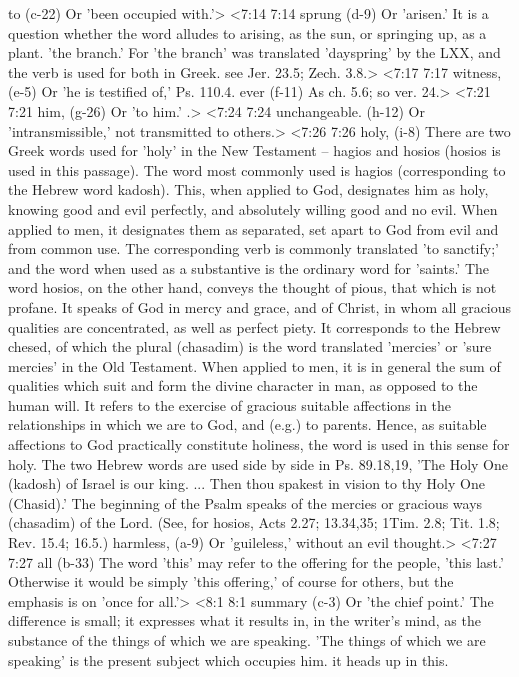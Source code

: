   to (c-22)  Or 'been occupied with.'>
<7:14 7:14  sprung (d-9)  Or 'arisen.' It is a question whether the word alludes to  arising, as the sun, or springing up, as a plant. 'the branch.'  For 'the branch' was translated 'dayspring' by the LXX, and the  verb is used for both in Greek. see Jer. 23.5; Zech. 3.8.>
<7:17 7:17  witness, (e-5)  Or 'he is testified of,' Ps. 110.4.
  ever (f-11)  As ch. 5.6; so ver. 24.>
<7:21 7:21  him, (g-26)  Or 'to him.' .>
<7:24 7:24  unchangeable. (h-12)  Or 'intransmissible,' not transmitted to others.>
<7:26 7:26  holy, (i-8)  There are two Greek words used for 'holy' in the New  Testament -- hagios and hosios (hosios is used in this  passage). The word most commonly used is hagios  (corresponding to the Hebrew word kadosh). This, when applied  to God, designates him as holy, knowing good and evil  perfectly, and absolutely willing good and no evil. When  applied to men, it designates them as separated, set apart to  God from evil and from common use. The corresponding verb is  commonly translated 'to sanctify;' and the word when used as a  substantive is the ordinary word for 'saints.' The word  hosios, on the other hand, conveys the thought of pious, that  which is not profane. It speaks of God in mercy and grace, and  of Christ, in whom all gracious qualities are concentrated, as  well as perfect piety. It corresponds to the Hebrew chesed,  of which the plural (chasadim) is the word translated  'mercies' or 'sure mercies' in the Old Testament. When applied  to men, it is in general the sum of qualities which suit and  form the divine character in man, as opposed to the human will.  It refers to the exercise of gracious suitable affections in  the relationships in which we are to God, and (e.g.) to  parents. Hence, as suitable affections to God practically  constitute holiness, the word is used in this sense for holy.  The two Hebrew words are used side by side in Ps. 89.18,19,  'The Holy One (kadosh) of Israel is our king. ... Then thou  spakest in vision to thy Holy One (Chasid).' The beginning of  the Psalm speaks of the mercies or gracious ways (chasadim)  of the Lord. (See, for hosios, Acts 2.27; 13.34,35; 1Tim.  2.8; Tit. 1.8; Rev. 15.4; 16.5.)
  harmless, (a-9)  Or 'guileless,' without an evil thought.>
<7:27 7:27  all (b-33)  The word 'this' may refer to the offering for the people,  'this last.' Otherwise it would be simply 'this offering,' of  course for others, but the emphasis is on 'once for all.'>
<8:1 8:1  summary (c-3)  Or 'the chief point.' The difference is small; it expresses  what it results in, in the writer's mind, as the substance of  the things of which we are speaking. 'The things of which we  are speaking' is the present subject which occupies him. it  heads up in this.
